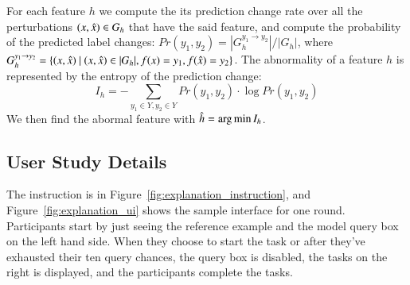 For each feature $h$ we compute the its prediction change rate over all the perturbations $(x, \hat{x}) \in G_{h}$ that have the said feature, and compute the probability of the predicted label changes: $Pr(y_1, y_2) = |G_h^{y_1\rightarrow y_2}|/|G_h|$, where $ G_h^{y_1\rightarrow y_2} = \{ (x, \xp)\ |\ (x, \xp) \in |G_h|, f(x)=y_1, f(\xp) = y_2 \}$.
The abnormality of a feature $h$ is represented by the entropy of the prediction change:
$$I_h = -\sum_{y_1 \in Y, y_2 \in Y} Pr(y_1, y_2) \cdot \log Pr(y_1, y_2)$$
We then find the abormal feature with $\hat{h} = \operatorname*{arg\,min} I_h$.



\subsection{User Study Details}
\label{appendix:exp_user_study}

The instruction is in Figure~\ref{fig:explanation_instruction}, and Figure~\ref{fig:explanation_ui} shows the sample interface for one round. 
Participants start by just seeing the reference example and the model query box on the left hand side.
When they choose to start the task or after they've exhausted their ten query chances, the query box is disabled, the tasks on the right is displayed, and the participants complete the tasks.